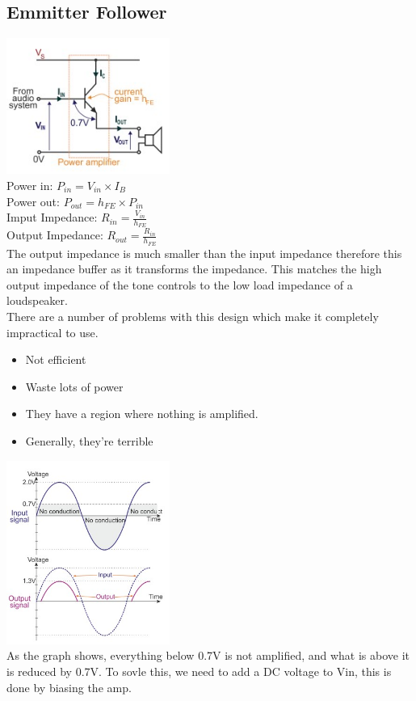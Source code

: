\documentclass[a4paper, 11pt, twocolumn]{article}
\begin{document}
    \subsection{Emmitter Follower}
    \includegraphics[width=0.4\textwidth]{emmitterFollower.jpg} \\
    Power in: $P_{in} = V_{in} \times I_B$\\
    Power out: $P_{out} = h_{FE} \times P_{in}$ \\
    Imput Impedance: $R_{in} = \frac{V_{in}}{h_{FE}}$ \\
    Output Impedance: $R_{out} = \frac{R_{in}}{h_{FE}}$ \\
    The output impedance is much smaller than the input impedance therefore this an impedance buffer as it transforms the impedance. This matches the high output impedance of the tone controls to the low load impedance of a loudspeaker. \\
    There are a number of problems with this design which make it completely impractical to use.
    \begin{itemize}
        \item Not efficient
        \item Waste lots of power
        \item They have a region where nothing is amplified.
        \item Generally, they're terrible
    \end{itemize}
    \includegraphics[width=0.4\textwidth]{issueWithEF.jpg}\\
    As the graph shows, everything below 0.7V is not amplified, and what is above it is reduced by 0.7V. To sovle this, we need to add a DC voltage to Vin, this is done by biasing the amp.
\end{document}
